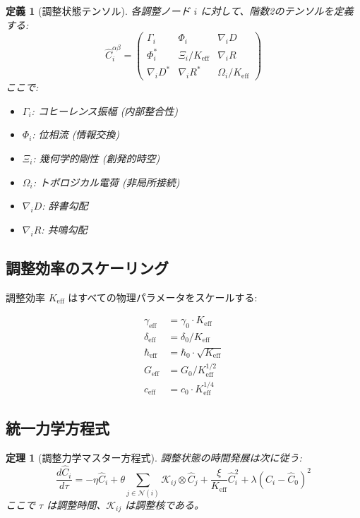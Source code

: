 \documentclass[11pt,a4paper]{article}
\newtheorem{theorem}{定理}
\newtheorem{definition}{定義}
\begin{document}
	\begin{definition}[調整状態テンソル]
		各調整ノード $i$ に対して、階数2のテンソルを定義する:
		\[
		\hat{C}_i^{\alpha\beta} = \begin{pmatrix}
			\Gamma_i & \Phi_i & \nabla_i D \\
			\Phi_i^* & \Xi_i/K_{\mathrm{eff}} & \nabla_i R \\
			\nabla_i D^* & \nabla_i R^* & \Omega_i/K_{\mathrm{eff}}
		\end{pmatrix}
		\]
		ここで:
		\begin{itemize}
			\item $\Gamma_i$: コヒーレンス振幅 (内部整合性)
			\item $\Phi_i$: 位相流 (情報交換)
			\item $\Xi_i$: 幾何学的剛性 (創発的時空)
			\item $\Omega_i$: トポロジカル電荷 (非局所接続)
			\item $\nabla_i D$: 辞書勾配
			\item $\nabla_i R$: 共鳴勾配
		\end{itemize}
	\end{definition}
	
	\subsection{調整効率のスケーリング}
	
	調整効率 $K_{\mathrm{eff}}$ はすべての物理パラメータをスケールする:
	
	\[
	\begin{aligned}
		\gamma_{\mathrm{eff}} &= \gamma_0 \cdot K_{\mathrm{eff}} \\
		\delta_{\mathrm{eff}} &= \delta_0 / K_{\mathrm{eff}} \\
		\hbar_{\mathrm{eff}} &= \hbar_0 \cdot \sqrt{K_{\mathrm{eff}}} \\
		G_{\mathrm{eff}} &= G_0 / K_{\mathrm{eff}}^{1/2} \\
		c_{\mathrm{eff}} &= c_0 \cdot K_{\mathrm{eff}}^{1/4}
	\end{aligned}
	\]
	
	\subsection{統一力学方程式}
	
	\begin{theorem}[調整力学マスター方程式]
		調整状態の時間発展は次に従う:
		\[
		\frac{d\hat{C}_i}{d\tau} = -\eta \hat{C}_i + \theta \sum_{j \in \mathcal{N}(i)} \mathcal{K}_{ij} \otimes \hat{C}_j + \frac{\xi}{K_{\mathrm{eff}}} \hat{C}_i^2 + \lambda (\hat{C}_i - \hat{C}_0)^2
		\]
		ここで $\tau$ は調整時間、$\mathcal{K}_{ij}$ は調整核である。
	\end{theorem}
	
\end{document}
